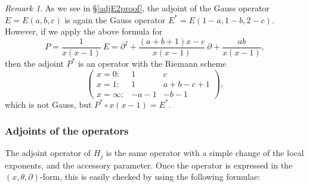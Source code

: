 \documentclass[a4paper,12pt]{article}
\theoremstyle{definition}
\theoremstyle{remark}
\newtheorem{remark}[thm]{Remark}
\numberwithin{equation}{section} %
\begin{document}
\begin{remark}
  As we see in \S \ref{adjE2proof}, the adjoint of the Gauss
  operator $E=E(a,b,c)$ is again the Gauss operator $E^*=E(1-a,1-b,2-c)$.
  However, if we apply the above formula for
  $$P=\dfrac{1}{x(x-1)}\ E=\partial^2+\dfrac{(a+b+1)x-c}{x(x-1)}\ \partial+\dfrac{ab}{x(x-1)},
  $$
  then the adjoint $P^*$ is an operator with the Riemann scheme
  $$\left(\begin{array}{lcc}x=0:&1&c\\ x=1:&1&a+b-c+1\\ x=\infty:&-a-1&-b-1\end{array}\right),
  $$
  which is not Gauss, but $P^*\circ x(x-1)=E^*.$    
\end{remark}
\noindent


\subsubsection{Adjoints of the operators}\label{GenAdjAdj}
The adjoint operator of $H_j$ is the same operator with a simple change of the local exponents, and the accessory parameter. Once the operator is expressed in the $(x,\theta,\partial)$-form, this is easily checked by using the following formulae:
\end{document}
